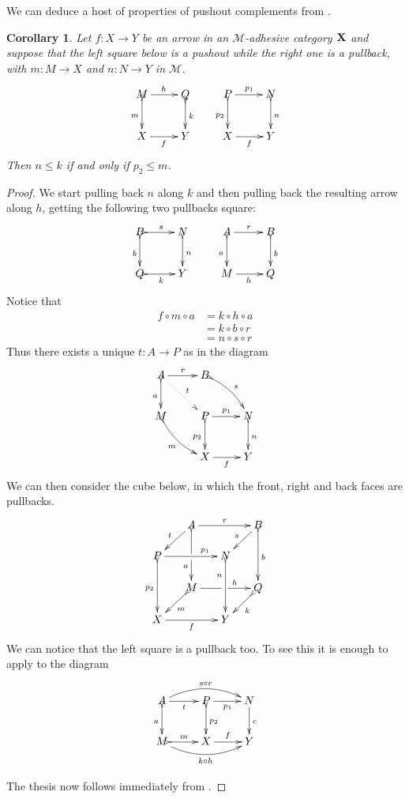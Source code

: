 \documentclass[a4paper]{article}
\def\X{\textbf {\textup{X}}}
\newtheorem{corollary}[theorem]{Corollary}
\theoremstyle{definition}
\begin{document}
We can deduce a host of properties of pushout complements from .

\begin{corollary}\label{lem:radj}
	Let $f\colon X\to Y$ be an arrow in an $\mathcal{M}$-adhesive category $\X$ and suppose that the left square below is a pushout while the  right one is a pullback, with $ m\colon M\to X$ and $n\colon N\to Y$ in $\mathcal{M}$.
	\[\xymatrix{M \ar@{>->}[d]_{m}\ar[r]^{h}& Q \ar@{>->}[d]^{k} & P \ar[r]^{p_1} \ar@{>->}[d]_{p_2}& N \ar@{>->}[d]^{n}\\X\ar[r]_{f}&Y &X \ar[r]_f&Y\\}\]
	Then $n\leq k$ if and only if $p_2\leq m$.
\end{corollary}
\begin{proof}  
	We start pulling back $n$ along $k$ and then pulling back the resulting arrow along $h$, getting the following two pullbacks square:
	\[\xymatrix{B \ar@{>->}[d]_{b}\ar@{>->}[r]^{s}& N \ar@{>->}[d]^{n} & A \ar[r]^{r} \ar@{>->}[d]_{a}& B \ar@{>->}[d]^{b}\\Q\ar@{>->}[r]_{k}&Y &M \ar[r]_h&Q\\}\]
	Notice that 
	\begin{align*}
		f\circ m\circ a&=k\circ h\circ a\\&=k\circ b\circ r\\&=n\circ s\circ r
	\end{align*}
	Thus there exists a unique $t\colon A\to P$ as in the diagram
	\[\xymatrix{A \ar@{>->}[d]_{a} \ar@{.>}[dr]^{t}\ar[r]^{r} &B \ar@{>->}@/^.2cm/[dr]^{s} \\ M \ar@{>->}@/_.2cm/[dr]_{m}&P\ar[r]^{p_1}  \ar@{>->}[d]_{p_2}& N \ar@{>->}[d]^{n}\\ &X \ar[r]_{f} & Y}\]
	We can then consider the cube below, in which the front, right and back faces are pullbacks.
	\[\xymatrix@C=15pt@R=15pt{&A\ar@{>->}[dd]|\hole_(.65){a}\ar[rr]^{r} \ar[dl]_{t} && B \ar@{>->}[dd]^{b} \ar[dl]_{s} \\ P  \ar@{>->}[dd]_{p_2}\ar[rr]^(.7){p_1} & & N \ar@{>->}[dd]_(.3){n}\\&M\ar[rr]|\hole^(.65){h} \ar@{>->}[dl]^{m} && Q \ar@{>->}[dl]^{k} \\X \ar[rr]_{f} & & Y}\]
	We can notice that the left square is a pullback too. To see this it is enough to apply  to the diagram
	\[\xymatrix{A  \ar@/^.4cm/[rr]^{s\circ r}\ar@{>->}[d]_{a} \ar[r]_{t}& \ar[r]_{p_1} P \ar@{>->}[d]^{p_2}& N \ar[d]^{c}\\ M \ar@/_.4cm/[rr]_{k\circ h}\ar@{>->}[r]^{m}& X \ar[r]^{f}& Y}\]
	
	The thesis now follows immediately from .
\end{proof}
\end{document}
